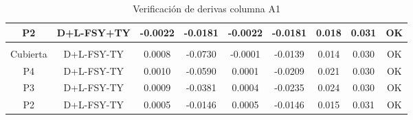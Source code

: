\begin{table}[H]
{\begin{tabular}{|c|c|c|c|c|c|c|c|c|}
    \hline
    P2  & D+L-FSY+TY & -0.0022 & -0.0181 & -0.0022 & -0.0181 & 0.018 & 0.031 & \cellcolor[rgb]{ .776,  .937,  .808}\textcolor[rgb]{ 0,  .38,  0}{OK} \bigstrut\\
    \hline
    \multicolumn{1}{|r}{} & \multicolumn{1}{r}{} & \multicolumn{1}{r}{} & \multicolumn{1}{r}{} & \multicolumn{1}{r}{} & \multicolumn{1}{r}{} & \multicolumn{1}{r}{} & \multicolumn{1}{r}{} &  \bigstrut\\
    \hline
    Cubierta & D+L-FSY-TY & 0.0008 & -0.0730 & -0.0001 & -0.0139 & 0.014 & 0.030 & \cellcolor[rgb]{ .776,  .937,  .808}\textcolor[rgb]{ 0,  .38,  0}{OK} \bigstrut\\
    \hline
    P4  & D+L-FSY-TY & 0.0010 & -0.0590 & 0.0001 & -0.0209 & 0.021 & 0.030 & \cellcolor[rgb]{ .776,  .937,  .808}\textcolor[rgb]{ 0,  .38,  0}{OK} \bigstrut\\
    \hline
    P3  & D+L-FSY-TY & 0.0009 & -0.0381 & 0.0004 & -0.0235 & 0.024 & 0.030 & \cellcolor[rgb]{ .776,  .937,  .808}\textcolor[rgb]{ 0,  .38,  0}{OK} \bigstrut\\
    \hline
    P2  & D+L-FSY-TY & 0.0005 & -0.0146 & 0.0005 & -0.0146 & 0.015 & 0.031 & \cellcolor[rgb]{ .776,  .937,  .808}\textcolor[rgb]{ 0,  .38,  0}{OK} \bigstrut\\
    \hline
    \end{tabular}}%
  \caption{Verificación de derivas columna A1}
  \label{tab:VDA1}%
\end{table}%
